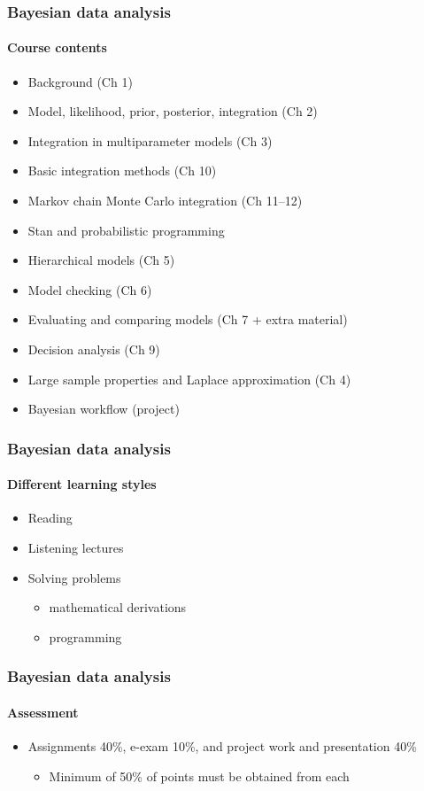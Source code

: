 \documentclass[english,t]{beamer}
\begin{document}
\begin{frame}
  \frametitle{Bayesian data analysis}  %
  \framesubtitle{Course contents}
  \begin{itemize}
  \item Background (Ch 1)
  \item Model, likelihood, prior, posterior, integration (Ch 2)
  \item Integration in multiparameter models (Ch 3)
  \item Basic integration methods (Ch 10)
  \item Markov chain Monte Carlo integration (Ch 11--12)
  \item Stan and probabilistic programming
  \item Hierarchical models (Ch 5)
  \item Model checking (Ch 6)
  \item Evaluating and comparing models (Ch 7 + extra material)
  \item Decision analysis (Ch 9)
  \item Large sample properties and Laplace approximation (Ch 4)
  \item Bayesian workflow (project)
  \end{itemize}
  
\end{frame}


\begin{frame}
  \frametitle{Bayesian data analysis}  %
  \framesubtitle{Different learning styles}

  \begin{itemize}
  \item Reading
  \item Listening lectures
  \item Solving problems
    \begin{itemize}
    \item mathematical derivations
    \item programming
    \end{itemize}
  \end{itemize}
  
\end{frame}

\begin{frame}
  \frametitle{Bayesian data analysis}  %
  \framesubtitle{Assessment}
  \begin{itemize}
  \item Assignments 40\%, e-exam 10\%, and project work and presentation 40\%
     \begin{itemize}
     \item Minimum of 50\% of points must be obtained from each
     \end{itemize}
  \end{itemize}

\end{frame}
\end{document}
